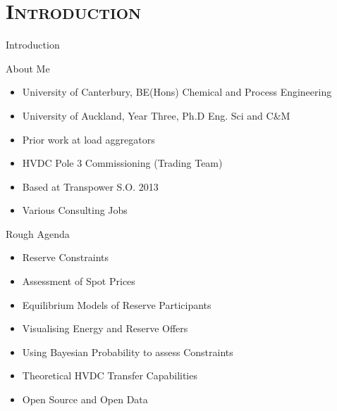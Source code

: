 \documentclass[xcolor=x11names,compress]{beamer}
\renewcommand{\(}{\begin{columns}}
\renewcommand{\)}{\end{columns}}
\newcommand{\<}[1]{\begin{column}{#1}}
\renewcommand{\>}{\end{column}}
\begin{document}
\section{\scshape Introduction}

\begin{frame}{Introduction}
\tableofcontents
\end{frame}

\begin{frame}{About Me}
\begin{itemize}
\item University of Canterbury, BE(Hons) Chemical and Process Engineering
\item University of Auckland, Year Three, Ph.D Eng. Sci and C\&M
\item Prior work at load aggregators
\item HVDC Pole 3 Commissioning (Trading Team)
\item Based at Transpower S.O. 2013
\item Various Consulting Jobs
\end{itemize}
\end{frame}

\begin{frame}{Rough Agenda}
\begin{itemize}
\item Reserve Constraints
\item Assessment of Spot Prices
\item Equilibrium Models of Reserve Participants
\item Visualising Energy and Reserve Offers
\item Using Bayesian Probability to assess Constraints
\item Theoretical HVDC Transfer Capabilities
\item Open Source and Open Data
\end{itemize}
\end{frame}
\end{document}
